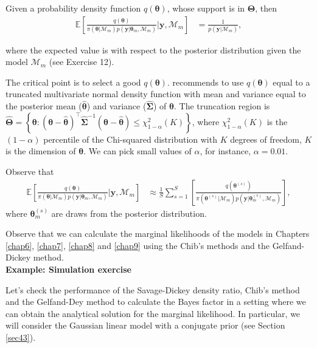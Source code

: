 Given a probability density function $q(\bm{\theta})$, whose support is in $\bm{\Theta}$, then
\begin{align*}
	\mathbb{E}\left[\frac{q(\bm{\theta})}{\pi(\bm{\theta}|\mathcal{M}_m)p(\bm{y}|\bm{\theta}_m,\mathcal{M}_m)}\biggr\rvert \bm{y},\mathcal{M}_m\right]&=\frac{1}{p(\bm{y}|\mathcal{M}_m)},
\end{align*} 

where the expected value is with respect to the posterior distribution given the model $\mathcal{M}_m$ (see Exercise 12).

The critical point is to select a good $q(\bm{\theta})$. \cite{geweke1999using} recommends to use $q(\bm{\theta})$ equal to a truncated multivariate normal density function with mean and variance equal to the posterior mean ($\hat{\bm{\theta}}$) and variance ($\hat{\bm{\Sigma}}$) of $\bm{\theta}$. The truncation region is $\hat{\bm{\Theta}}=\left\{\bm{\theta}:(\bm{\theta}-\hat{\bm{\theta}})^{\top}\hat{\bm{\Sigma}}^{-1}(\bm{\theta}-\hat{\bm{\theta}})\leq \chi_{1-\alpha}^2(K)\right\}$, where $\chi_{1-\alpha}^2(K)$ is the $(1-\alpha)$ percentile of the Chi-squared distribution with $K$ degrees of freedom, $K$ is the dimension of $\bm{\theta}$. We can pick small values of $\alpha$, for instance, $\alpha=0.01$.

Observe that 
\begin{align*}
	\mathbb{E}\left[\frac{q(\bm{\theta})}{\pi(\bm{\theta}|\mathcal{M}_m)p(\bm{y}|\bm{\theta}_m,\mathcal{M}_m)}\biggr\rvert \bm{y},\mathcal{M}_m\right]&\approx \frac{1}{S}\sum_{s=1}^S \left[\frac{q(\bm{\theta}^{(s)})}{\pi(\bm{\theta}^{(s)}|\mathcal{M}_m)p(\bm{y}|\bm{\theta}^{(s)}_m,\mathcal{M}_m)}\right],
\end{align*}
where $\bm{\theta}^{(s)}_m$ are draws from the posterior distribution.

Observe that we can calculate the marginal likelihoods of the models in Chapters \ref{chap6}, \ref{chap7}, \ref{chap8} and \ref{chap9} using the Chib's methods and the Gelfand-Dickey method.\\
    

\textbf{Example: Simulation exercise}

Let's check the performance of the Savage-Dickey density ratio, Chib's method and the Gelfand-Dey method to calculate the Bayes factor in a setting where we can obtain the analytical solution for the marginal likelihood. In particular, we will consider the Gaussian linear model with a conjugate prior (see Section \ref{sec43}).

